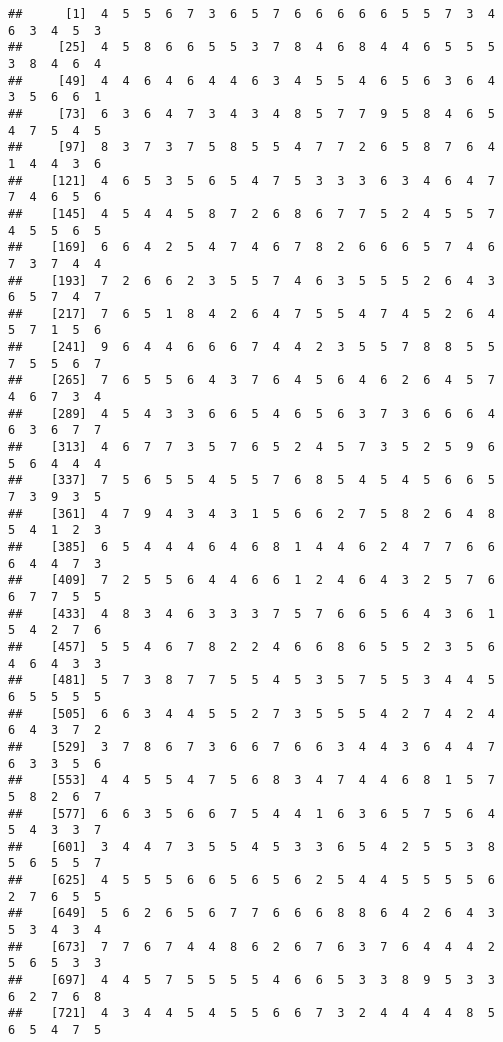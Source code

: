 \documentclass[
]{book}
\begin{document}
\begin{verbatim}
##      [1]  4  5  5  6  7  3  6  5  7  6  6  6  6  6  5  5  7  3  4  6  3  4  5  3
##     [25]  4  5  8  6  6  5  5  3  7  8  4  6  8  4  4  6  5  5  5  3  8  4  6  4
##     [49]  4  4  6  4  6  4  4  6  3  4  5  5  4  6  5  6  3  6  4  3  5  6  6  1
##     [73]  6  3  6  4  7  3  4  3  4  8  5  7  7  9  5  8  4  6  5  4  7  5  4  5
##     [97]  8  3  7  3  7  5  8  5  5  4  7  7  2  6  5  8  7  6  4  1  4  4  3  6
##    [121]  4  6  5  3  5  6  5  4  7  5  3  3  3  6  3  4  6  4  7  7  4  6  5  6
##    [145]  4  5  4  4  5  8  7  2  6  8  6  7  7  5  2  4  5  5  7  4  5  5  6  5
##    [169]  6  6  4  2  5  4  7  4  6  7  8  2  6  6  6  5  7  4  6  7  3  7  4  4
##    [193]  7  2  6  6  2  3  5  5  7  4  6  3  5  5  5  2  6  4  3  6  5  7  4  7
##    [217]  7  6  5  1  8  4  2  6  4  7  5  5  4  7  4  5  2  6  4  5  7  1  5  6
##    [241]  9  6  4  4  6  6  6  7  4  4  2  3  5  5  7  8  8  5  5  7  5  5  6  7
##    [265]  7  6  5  5  6  4  3  7  6  4  5  6  4  6  2  6  4  5  7  4  6  7  3  4
##    [289]  4  5  4  3  3  6  6  5  4  6  5  6  3  7  3  6  6  6  4  6  3  6  7  7
##    [313]  4  6  7  7  3  5  7  6  5  2  4  5  7  3  5  2  5  9  6  5  6  4  4  4
##    [337]  7  5  6  5  5  4  5  5  7  6  8  5  4  5  4  5  6  6  5  7  3  9  3  5
##    [361]  4  7  9  4  3  4  3  1  5  6  6  2  7  5  8  2  6  4  8  5  4  1  2  3
##    [385]  6  5  4  4  4  6  4  6  8  1  4  4  6  2  4  7  7  6  6  6  4  4  7  3
##    [409]  7  2  5  5  6  4  4  6  6  1  2  4  6  4  3  2  5  7  6  6  7  7  5  5
##    [433]  4  8  3  4  6  3  3  3  7  5  7  6  6  5  6  4  3  6  1  5  4  2  7  6
##    [457]  5  5  4  6  7  8  2  2  4  6  6  8  6  5  5  2  3  5  6  4  6  4  3  3
##    [481]  5  7  3  8  7  7  5  5  4  5  3  5  7  5  5  3  4  4  5  6  5  5  5  5
##    [505]  6  6  3  4  4  5  5  2  7  3  5  5  5  4  2  7  4  2  4  6  4  3  7  2
##    [529]  3  7  8  6  7  3  6  6  7  6  6  3  4  4  3  6  4  4  7  6  3  3  5  6
##    [553]  4  4  5  5  4  7  5  6  8  3  4  7  4  4  6  8  1  5  7  5  8  2  6  7
##    [577]  6  6  3  5  6  6  7  5  4  4  1  6  3  6  5  7  5  6  4  5  4  3  3  7
##    [601]  3  4  4  7  3  5  5  4  5  3  3  6  5  4  2  5  5  3  8  5  6  5  5  7
##    [625]  4  5  5  5  6  6  5  6  5  6  2  5  4  4  5  5  5  5  6  2  7  6  5  5
##    [649]  5  6  2  6  5  6  7  7  6  6  6  8  8  6  4  2  6  4  3  5  3  4  3  4
##    [673]  7  7  6  7  4  4  8  6  2  6  7  6  3  7  6  4  4  4  2  5  6  5  3  3
##    [697]  4  4  5  7  5  5  5  5  4  6  6  5  3  3  8  9  5  3  3  6  2  7  6  8
##    [721]  4  3  4  4  5  4  5  5  6  6  7  3  2  4  4  4  4  8  5  6  5  4  7  5

\end{verbatim}
\end{document}
